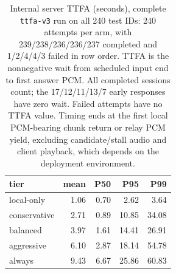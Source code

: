 \begin{table}[!ht]
\centering\small
\caption{Internal server TTFA (seconds), complete \texttt{ttfa-v3} run on all 240 test IDs: 240 attempts per arm, with 239/238/236/236/237 completed and 1/2/4/4/3 failed in row order. TTFA is the nonnegative wait from scheduled input end to first answer PCM. All completed sessions count; the 17/12/11/13/7 early responses have zero wait. Failed attempts have no TTFA value. Timing ends at the first local PCM-bearing chunk return or relay PCM yield, excluding candidate/stall audio and client playback, which depends on the deployment environment.}
\label{tab:latency}
\begin{tabular}{lrrrr}
\toprule
tier & mean & P50 & P95 & P99 \\
\midrule
local-only & 1.06 & 0.70 & 2.62 & 3.64 \\
conservative & 2.71 & 0.89 & 10.85 & 34.08 \\
balanced & 3.97 & 1.61 & 14.41 & 26.91 \\
aggressive & 6.10 & 2.87 & 18.14 & 54.78 \\
always & 9.43 & 6.67 & 25.86 & 60.83 \\
\bottomrule
\end{tabular}
\end{table}
